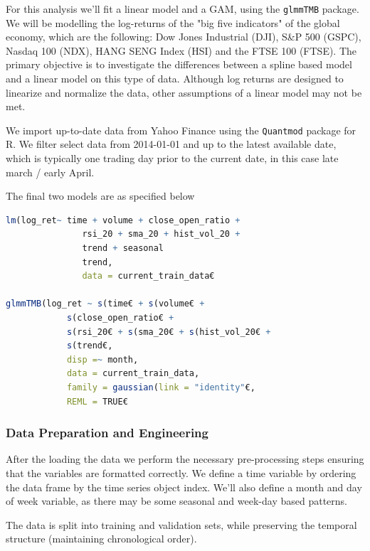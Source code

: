 \documentclass[12pt, twoside,hidelinks]{article}
\theoremstyle{definition}
\numberwithin{equation}{section}
\begin{document}
For this analysis we'll fit a linear model and a GAM, using the \texttt{glmmTMB} package. We will be modelling the log-returns of the "big five indicators" of the global economy, which are the following: Dow Jones Industrial (DJI), S\&P 500 (GSPC), Nasdaq 100 (NDX), HANG SENG Index (HSI) and the FTSE 100 (FTSE). The primary objective is to investigate the differences between a spline based model and a linear model on this type of data. Although log returns are designed to linearize and normalize the data, other assumptions of a linear model may not be met.
\newline

We import up-to-date data from Yahoo Finance using the \texttt{Quantmod} package for R. We filter select data from 2014-01-01 and up to the latest available date, which is typically one trading day prior to the current date, in this case late march / early April. 

The final two models are as specified below

\begin{lstlisting}[language=R]
lm(log_ret~ time + volume + close_open_ratio +
               rsi_20 + sma_20 + hist_vol_20 +
               trend + seasonal
               trend,
               data = current_train_data€

glmmTMB(log_ret ~ s(time€ + s(volume€ + 
            s(close_open_ratio€ +
            s(rsi_20€ + s(sma_20€ + s(hist_vol_20€ +
            s(trend€,
            disp =~ month,
            data = current_train_data,
            family = gaussian(link = "identity"€,
            REML = TRUE€
\end{lstlisting}

\subsubsection*{Data Preparation and Engineering}

After the loading the data we perform the necessary pre-processing steps ensuring that the variables are formatted correctly. We define a time variable by ordering the data frame by the time series object index. We'll also define a month and day of week variable, as there may be some seasonal and week-day based patterns. 
\newline

The data is split into training and validation sets, while preserving the temporal structure (maintaining chronological order). 
\newline
\end{document}
